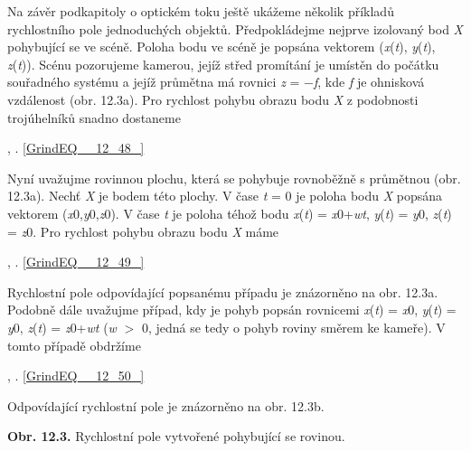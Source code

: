\noindent 

\noindent Na závěr podkapitoly o optickém toku ještě ukážeme několik příkladů rychlostního pole jednoduchých objektů. Předpokládejme nejprve izolovaný bod \textit{X} pohybující se ve scéně. Poloha bodu ve scéně je popsána vektorem (\textit{x}(\textit{t}), \textit{y}(\textit{t}), \textit{z}(\textit{t})). Scénu pozorujeme kamerou, jejíž střed promítání je umístěn do počátku souřadného systému a jejíž průmětna má rovnici \textit{z} = $-$\textit{f}, kde \textit{f} je ohnisková vzdálenost (obr. 12.3a). Pro rychlost pohybu obrazu bodu \textit{X} z podobnosti trojúhelníků snadno dostaneme

 ,     . \eqref{GrindEQ__12_48_}

\noindent Nyní uvažujme rovinnou plochu, která se pohybuje rovnoběžně s průmětnou (obr. 12.3a). Nechť \textit{X} je bodem této plochy. V čase \textit{t} = 0 je poloha bodu \textit{X} popsána vektorem (\textit{x}0,\textit{y}0,\textit{z}0). V čase \textit{t} je poloha téhož bodu \textit{x}(\textit{t}) = \textit{x}0+\textit{wt}, \textit{y}(\textit{t}) = \textit{y}0, \textit{z}(\textit{t}) = \textit{z}0. Pro rychlost pohybu obrazu bodu \textit{X} máme

 ,   . \eqref{GrindEQ__12_49_}

\noindent Rychlostní pole odpovídající popsanému případu je znázorněno na obr. 12.3a. Podobně dále uvažujme případ, kdy je pohyb popsán rovnicemi \textit{x}(\textit{t}) = \textit{x}0, \textit{y}(\textit{t}) = \textit{y}0, \textit{z}(\textit{t}) = \textit{z}0+\textit{wt} (\textit{w} $>$ 0, jedná se tedy o pohyb roviny směrem ke kameře). V tomto případě obdržíme 

 ,     . \eqref{GrindEQ__12_50_}

\noindent Odpovídající rychlostní pole je znázorněno na obr. 12.3b.

\noindent 

\noindent 

\noindent 

\noindent 

\noindent \textbf{Obr. 12.3.} Rychlostní pole vytvořené pohybující se rovinou.

